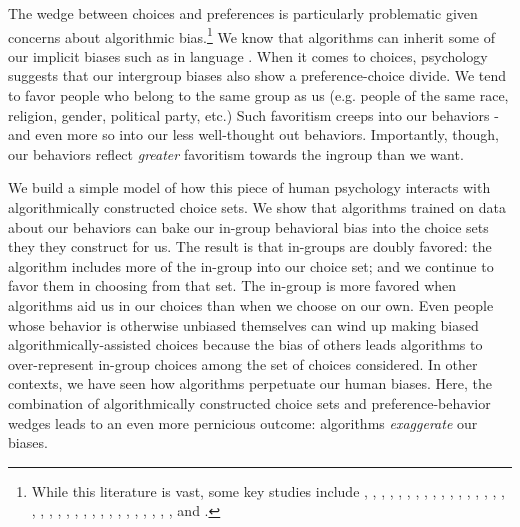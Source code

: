 \documentclass[12pt,letterpaper]{article}
\begin{document}
The wedge between choices and preferences is particularly problematic given concerns about algorithmic bias.\footnote{While this literature is vast, some key studies include \citealt{BarocasHardtNarayan-FairnessBook}, \citealt{BarocasSelbst2016}, \citealt{BolukbasiEtAl(16)}, \citealt{Boyd2012}, \citealt{CaliskanEtAl(17)}, \citealt{Chouldechova2017b}, \citealt{ChouldechovaRoth(20)}, \citealt{CorbettDaviesEtAl2017}, \citealt{CowgillTucker2019}, \citealt{Dwork2012}, \citealt{FusterEtAl(18)}, \citealt{GillisSpiess(19)}, \citealt{HardtPriceSrebro2016}, \citealt{HeidariEtAl(18)}, \citealt{HuChen(18)-WelfareFairness}, \citealt{KamishimaEtAl(11)}, \citealt{KamishimaEtAl(12)}, \citealt{KLMR(18)}, \citealt{KLMS(18)}, \citealt{KLMS(20)-PNAS}, \citealt{KM2019}, \citealt{LiptonEtAl(18)}, \citealt{LiuEtAl(18)}, \citealt{Mayson(18)}, \citealt{MenonWilliamson(18)}, \citealt{MitchellEtAl(19)}, \citealt{ObermeyerEtAl(19)}, \citealt{PleissEtAl(17)}, \citealt{RKM2017}, \citealt{RaghavanEtAl(19)}, \citealt{RambachanEtAl(20)-PP}, \citealt{RambachanEtAl(20)}, \citealt{RambachanRoth(19)-BiasInBiasOut}, \citealt{ZemelEtAl(13)}, and \citealt{ZafarEtAl(19)}. } We know that algorithms can inherit some of our implicit biases such as in language \citep{caliskan2017semantics}. When it comes to choices, psychology suggests that our intergroup biases also show a preference-choice divide. We tend to favor people who belong to the same group as us (e.g. people of the same race, religion, gender, political party, etc.) Such favoritism creeps into our behaviors - and even more so into our less well-thought out behaviors.  Importantly, though, our behaviors reflect {\em greater} favoritism towards the ingroup than we want. 

We build a simple model of how this piece of human psychology interacts with algorithmically constructed choice sets. We show that algorithms trained on data about our behaviors can bake our in-group behavioral bias into the choice sets they they construct for us. The result is that in-groups are doubly favored: the algorithm includes more of the in-group into our choice set; and we continue to favor them in choosing from that set. The in-group is more favored when algorithms aid us in our choices than when we choose on our own. Even people whose behavior is otherwise unbiased themselves can wind up making biased algorithmically-assisted choices because the bias of others leads algorithms to over-represent in-group choices among the set of choices considered. In other contexts, we have seen how algorithms perpetuate our human biases. Here, the combination of algorithmically constructed choice sets and preference-behavior wedges leads to an even more pernicious outcome: algorithms {\em exaggerate} our biases.  
\end{document}
